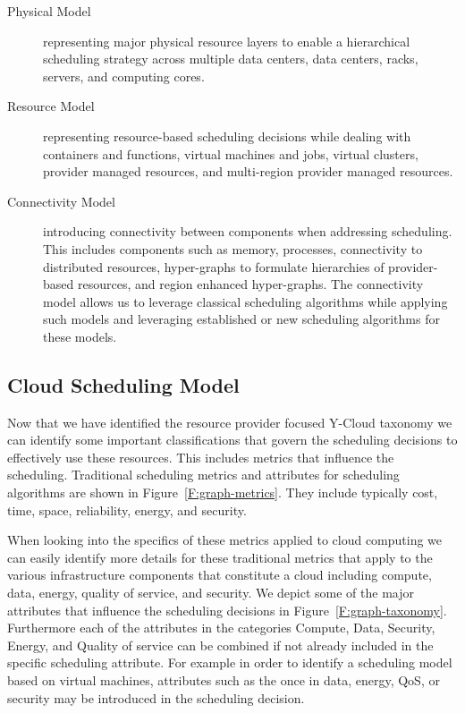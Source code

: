 \documentclass[final,5p,times,twocolumn]{elsarticle}
\begin{document}
\begin{description}

\item[Physical Model] representing major physical resource layers to
  enable a hierarchical scheduling strategy across multiple data
  centers, data centers, racks, servers, and computing cores.

\item[Resource Model] representing resource-based scheduling
  decisions while dealing with  containers and functions, virtual
  machines and jobs, virtual clusters, provider managed resources, and
  multi-region provider managed resources.

\item[Connectivity Model] introducing connectivity between components
  when addressing scheduling. This includes components such as memory,
  processes, connectivity to distributed resources, hyper-graphs to
  formulate hierarchies of provider-based resources, and region
  enhanced hyper-graphs. The connectivity model allows us to leverage
  classical scheduling algorithms while applying such models and
  leveraging established or new scheduling algorithms for these
  models.

\end{description}



\subsection{Cloud Scheduling Model}

Now that we have identified the resource provider focused Y-Cloud
taxonomy we can identify some important classifications that govern the
scheduling decisions to effectively use these resources. This includes
metrics that influence the scheduling. Traditional scheduling metrics
and attributes for scheduling algorithms are shown in
Figure~\ref{F:graph-metrics}. They include typically cost, time, space,
reliability, energy, and security.



When looking into the specifics of these metrics applied to cloud
computing we can easily identify more details for these traditional
metrics that apply to the various infrastructure components that
constitute a cloud including compute, data, energy, quality of
service, and security. We depict some of the major attributes that
influence the scheduling decisions in Figure~\ref{F:graph-taxonomy}.
Furthermore each of the attributes in the categories Compute, Data,
Security, Energy, and Quality of service can be combined if not
already included in the specific scheduling attribute. For example in
order to identify a scheduling model based on virtual machines,
attributes such as the once in data, energy, QoS, or security may be
introduced in the scheduling decision.
\end{document}
